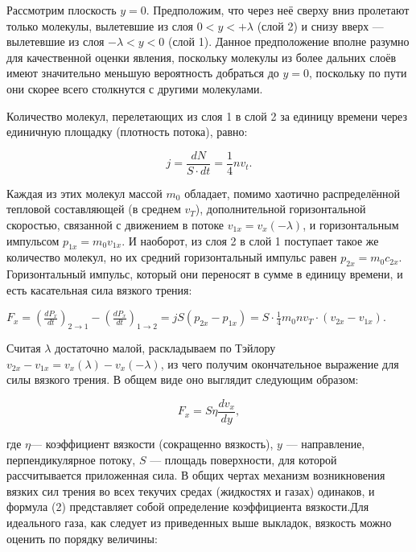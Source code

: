 \documentclass[10pt]{article}
\begin{document}
Рассмотрим плоскость $y = 0$. Предположим, что через неё сверху вниз пролетают только молекулы, вылетевшие из слоя $0 < y < +\lambda$ (слой 2) и снизу вверх — вылетевшие из слоя $-\lambda < y < 0$ (слой 1). Данное предположение вполне разумно для качественной оценки явления, поскольку молекулы из более дальних слоёв имеют значительно меньшую вероятность добраться до $ y = 0$, поскольку по пути они скорее всего столкнутся с другими молекулами.

Количество молекул, перелетающих из слоя 1 в слой 2 за единицу времени через единичную площадку (плотность потока), равно:

\begin{equation}
        j = \frac{dN}{S \cdot dt} = \frac{1}{4} n v_t.
\end{equation}

Каждая из этих молекул массой $m_0$ обладает, помимо хаотично распределённой тепловой составляющей (в среднем $v_T$), дополнительной горизонтальной скоростью, связанной с движением в потоке $v_{1 x} = v_x(-\lambda)$, и горизонтальным импульсом $p_{1 x} = m_0 v_{1 x}$.
И наоборот, из слоя 2 в слой 1 поступает такое же количество молекул, но их средний горизонтальный импульс равен $p_{2 x} = m_0 c_{2 x}$. Горизонтальный импульс, который они переносят в сумме в единицу времени, и есть касательная сила вязкого трения:



$F_x = (\frac{dP_x}{dt})_{2 \to 1}  - (\frac{dP_x}{dt})_{1 \to 2} = j S (p_{2 x} - p_{1 x}) = S \cdot \frac{1}{4} m_0 n v_T \cdot (v_{2 x} - v_{1 x}).$



Считая $\lambda$ достаточно  малой,  раскладываем  по  Тэйлору $v_{2 x} - v_{1 x} = v_{x}(\lambda) - v_{x}(-\lambda)$, из чего получим окончательное
выражение для силы вязкого трения. В общем виде оно выглядит
следующим образом:

\begin{equation}
        F_x = S \eta \frac{d v_x}{dy}, 
\end{equation}

где $\eta$— коэффициент вязкости (сокращенно вязкость), $y$ — направление, перпендикулярное потоку, $S$ — площадь поверхности, для которой рассчитывается приложенная сила. В общих чертах механизм возникновения вязких сил трения во всех текучих средах (жидкостях и газах) одинаков, и формула (2) представляет собой определение
коэффициента вязкости.Для идеального газа, как следует из приведенных выше выкладок, вязкость можно оценить
по порядку величины:
\end{document}
